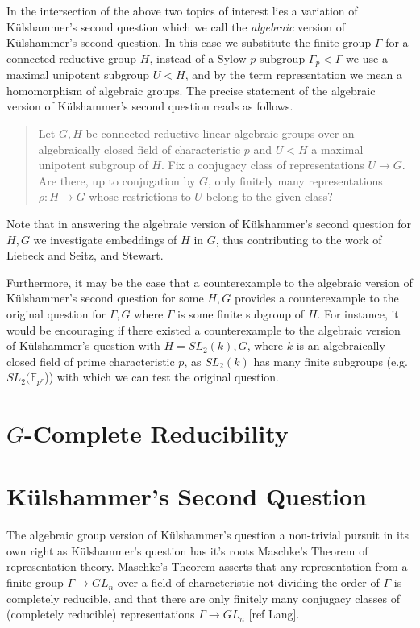 In the intersection of the above two topics of interest lies a variation of K\"ulshammer's second question which we call the \emph{algebraic} version of K\"ulshammer's second question. In this case we substitute the finite group $\Gamma$ for a connected reductive group $H$, instead of a Sylow $p$-subgroup $\Gamma_p < \Gamma$ we use a maximal unipotent subgroup $U < H$, and by the term representation we mean a homomorphism of algebraic groups.
The precise statement of the algebraic version of K\"ulshammer's second question reads as follows.
\begin{quote}
  Let $G,H$ be connected reductive linear algebraic groups over an algebraically closed field of characteristic $p$ and $U < H$ a maximal unipotent subgroup of $H$. Fix a conjugacy class of representations $U\rightarrow G$. Are there, up to conjugation by $G$, only finitely many representations $\rho:H\rightarrow G$ whose restrictions to $U$ belong to the given class?
\end{quote}

Note that in answering the algebraic version of K\"ulshammer's second question for $H,G$ we investigate embeddings of $H$ in $G$, thus contributing to the work of Liebeck and Seitz, and Stewart.

Furthermore, it may be the case that a counterexample to the algebraic version of K\"ulshammer's second question for some $H, G$ provides a counterexample to the original question for $\Gamma, G$ where $\Gamma$ is some finite subgroup of $H$. For instance, it would be encouraging if there existed a counterexample to the algebraic version of K\"ulshammer's question with $H = SL_2(k), G$, where $k$ is an algebraically closed field of prime characteristic $p$, as $SL_2(k)$ has many finite subgroups (e.g. $SL_2(\mathbb{F}_{p^r}$)) with which we can test the original question.

\section{$G$-Complete Reducibility}

\section{K\"ulshammer's Second Question}

The algebraic group version of K\"ulshammer's question a non-trivial pursuit in its own right as K\"ulshammer's question has it's roots Maschke's Theorem of representation theory. Maschke's Theorem asserts that any representation from a finite group $\Gamma \rightarrow GL_n$ over a field of characteristic not dividing the order of $\Gamma$ is completely reducible, and that there are only finitely many conjugacy classes of (completely reducible) representations $\Gamma \rightarrow GL_n$ [ref Lang].


